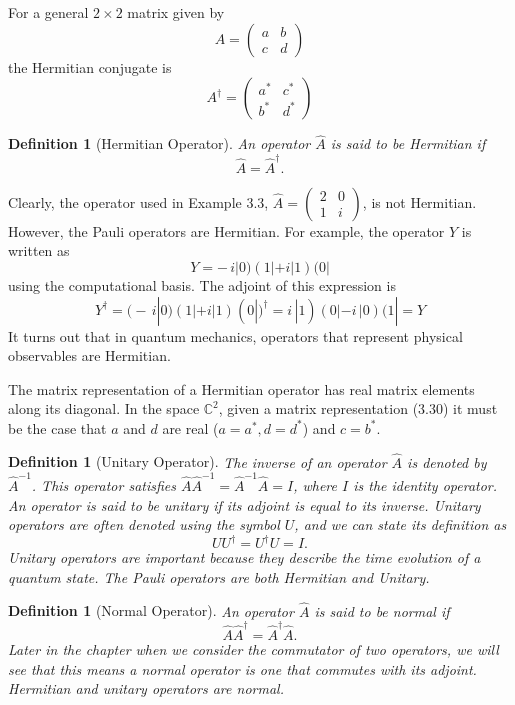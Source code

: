 \documentclass{article}
\newtheorem{definition}[theorem]{Definition}
\begin{document}
For a general \(2 \times 2\) matrix given by
\[
A = \begin{pmatrix} a & b \\ c & d \end{pmatrix} \tag{3.30}
\]
the Hermitian conjugate is
\[
A^\dagger 
= \begin{pmatrix} 
a^* & c^* \\ 
b^* & d^* 
\end{pmatrix} 
\tag{3.31}
\]

\begin{definition}[Hermitian Operator]
An operator \(\hat{A}\) is said to be Hermitian if
\[
\hat{A} = \hat{A}^{\dagger}.
\tag{3.32}
\]
\end{definition}

Clearly, the operator used in Example 3.3, \(\hat{A} = \begin{pmatrix}2 & 0\\ 1&i\end{pmatrix}\), is not Hermitian. However, the Pauli operators are Hermitian. For example, the operator \(Y\) is written as 
\[
Y = -\,i|0)(1| + i|1)(0|
\]
using the computational basis. The adjoint of this
expression is
\[
Y^\dagger 
= \bigl(-\,i|0)(1| + i|1)(0| \bigr)^\dagger
= i\,|1)(0| - i\,|0)(1|
= Y
\tag{3.33}
\]
It turns out that in quantum mechanics, operators that represent physical observables are Hermitian.

The matrix representation of a Hermitian operator has real matrix elements
along its diagonal. In the space \(\mathbb{C}^2\), given a matrix representation (3.30) it must be the case that \(a\) and \(d\) are real (\(a = a^*, d = d^*\)) and \(c = b^*\).

\begin{definition}[Unitary Operator]
The inverse of an operator \(\hat{A}\) is denoted by \(\hat{A}^{-1}\). This operator satisfies \(\hat{A}\hat{A}^{-1} = \hat{A}^{-1}\hat{A} = I\), where \(I\) is the identity operator. An operator is said to be unitary if its adjoint is equal to its inverse. Unitary operators are often denoted using the symbol \(U\), and we can state its definition as
\[
U U^{\dagger} = U^{\dagger} U = I.
\tag{3.34}
\]
Unitary operators are important because they describe the time evolution of a quan\-tum state. The Pauli operators are both Hermitian and Unitary.
\end{definition}

\begin{definition}[Normal Operator]
An operator \(\hat{A}\) is said to be normal if
\[
\hat{A}\hat{A}^{\dagger} = \hat{A}^{\dagger}\hat{A}.
\tag{3.35}
\]
Later in the chapter when we consider the commutator of two operators, we will see that this means a normal operator is one that commutes with its adjoint. Hermitian and unitary operators are normal.
\end{definition}
\end{document}
